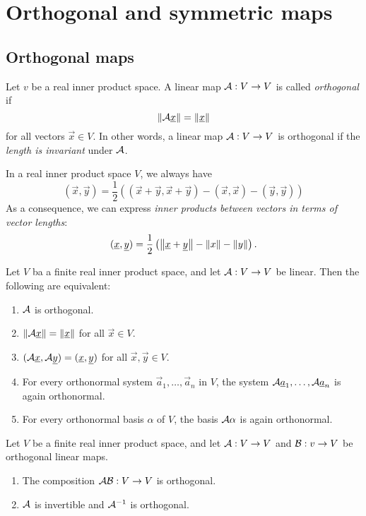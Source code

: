 \section{Orthogonal and symmetric maps}

\subsection{Orthogonal maps}
\begin{definition}
    Let $v$ be a real inner product space. A linear map $\mathcal{A}: V \to V$ is called \emph{orthogonal} if
    $$\norm{\mathcal{A}\underline{x}} = \norm{\underline{x}}$$
    for all vectors $\vec{x} \in V$. In other words, a linear map $\mathcal{A}: V \to V$ is orthogonal if the \emph{length is invariant} under $\mathcal{A}$.
\end{definition}

\begin{theorem}
    In a real inner product space $V$, we always have
    $$(\vec{x},\vec{y}) = \frac{1}{2}\left((\vec{x}+\vec{y},\vec{x}+\vec{y})-(\vec{x},\vec{x})-(\vec{y},\vec{y})\right)$$
    As a consequence, we can express \emph{inner products between vectors in terms of vector lengths}:
    $$(\underline{x},\underline{y}) = \frac{1}{2}\left(\norm{\underline{x}+\underline{y}}-\norm{x}-\norm{y}\right).$$
\end{theorem}

\begin{theorem}
    Let $V$ ba a finite real inner product space, and let $\mathcal{A}: V \to V$ be linear. Then the following are equivalent:
    \begin{enumerate}
        \item $\mathcal{A}$ is orthogonal.
        \item $\norm{\mathcal{A}\underline{x}} = \norm{\underline{x}}$ for all $\vec{x} \in V$.
        \item $(\mathcal{A}\underline{x},\mathcal{A}\underline{y}) = (\underline{x},\underline{y})$ for all $\vec{x},\vec{y} \in V$.
        \item For every orthonormal system $\vec{a}_1,\dots,\vec{a}_n$ in $V$, the system $\mathcal{A}\underline{a}_1,\dots,\mathcal{A}\underline{a}_n$ is again orthonormal.
        \item For every orthonormal basis $\alpha$ of $V$, the basis $\mathcal{A}\alpha$ is again orthonormal.
    \end{enumerate}
\end{theorem}

\begin{theorem}
    Let $V$ be a finite real inner product space, and let $\mathcal{A}: V \to V$ and $\mathcal{B}: v \to V$ be orthogonal linear maps. 
    \begin{enumerate}
        \item The composition $\mathcal{A}\mathcal{B}: V \to V$ is orthogonal.
        \item $\mathcal{A}$ is invertible and $\mathcal{A}^{-1}$ is orthogonal.
    \end{enumerate}
\end{theorem}


